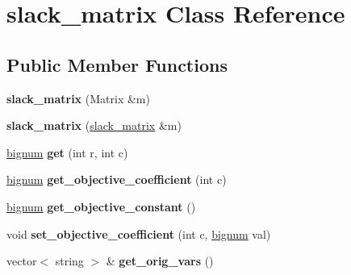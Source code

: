 \hypertarget{classslack__matrix}{\section{slack\-\_\-matrix \-Class \-Reference}
\label{classslack__matrix}
}
\subsection*{\-Public \-Member \-Functions}
\begin{DoxyCompactItemize}
\item 
\hypertarget{classslack__matrix_a209c4c157ab1fc40ef400e2bd4b389c6}{{\bfseries slack\-\_\-matrix} (\-Matrix \&m)}\label{classslack__matrix_a209c4c157ab1fc40ef400e2bd4b389c6}

\item 
\hypertarget{classslack__matrix_af7a044eb7e13b9ad9779f00ffc79bbc8}{{\bfseries slack\-\_\-matrix} (\hyperlink{classslack__matrix}{slack\-\_\-matrix} \&m)}\label{classslack__matrix_af7a044eb7e13b9ad9779f00ffc79bbc8}

\item 
\hypertarget{classslack__matrix_ab52e34aa21233caa0aceee516677dd79}{\hyperlink{classbignum}{bignum} {\bfseries get} (int r, int c)}\label{classslack__matrix_ab52e34aa21233caa0aceee516677dd79}

\item 
\hypertarget{classslack__matrix_aae370c988e2fd49702e94e890425d587}{\hyperlink{classbignum}{bignum} {\bfseries get\-\_\-objective\-\_\-coefficient} (int c)}\label{classslack__matrix_aae370c988e2fd49702e94e890425d587}

\item 
\hypertarget{classslack__matrix_add8aefcf2ee320a8457f46364718d030}{\hyperlink{classbignum}{bignum} {\bfseries get\-\_\-objective\-\_\-constant} ()}\label{classslack__matrix_add8aefcf2ee320a8457f46364718d030}

\item 
\hypertarget{classslack__matrix_acaedf525d233784bb1593c36b30caac3}{void {\bfseries set\-\_\-objective\-\_\-coefficient} (int c, \hyperlink{classbignum}{bignum} val)}\label{classslack__matrix_acaedf525d233784bb1593c36b30caac3}

\item 
\hypertarget{classslack__matrix_ad0fdc97a5ab8d0e3ec4507c4470e5395}{vector$<$ string $>$ \& {\bfseries get\-\_\-orig\-\_\-vars} ()}\label{classslack__matrix_ad0fdc97a5ab8d0e3ec4507c4470e5395}


\end{DoxyCompactItemize}
